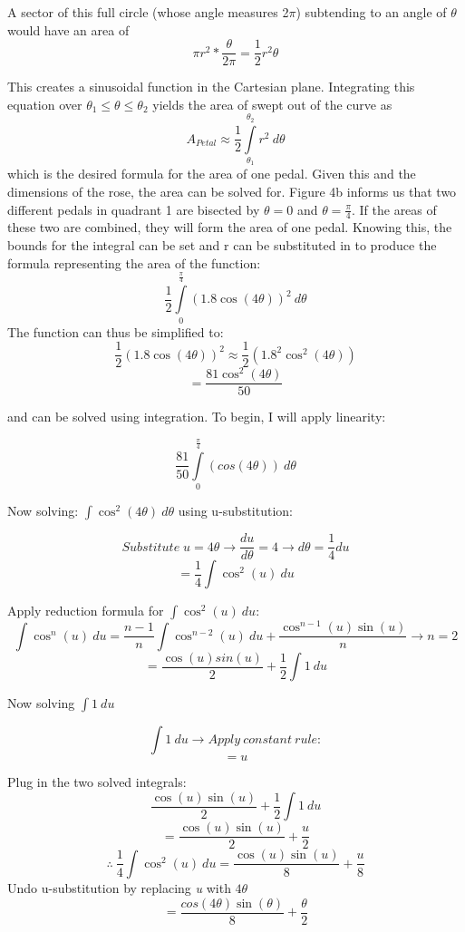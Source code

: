 \documentclass[11pt]{article}
\begin{document}
A sector of this full circle (whose angle measures 2$\pi$) subtending to an angle of $\theta$ would have an area of \\[-2ex]
\[\pi r^2 * \frac{\theta}{2\pi} = \frac{1}{2}r^2\theta\]

This creates a sinusoidal function in the Cartesian plane. Integrating this equation over $\theta_1 \leq \theta \leq \theta_2$ yields the area of swept out of the curve as
\[A_{Petal} \approx \frac{1}{2}\int\limits_{\theta_1}^{\theta_2} r^2 \ d\theta \]
which is the desired formula for the area of one pedal. Given this and the dimensions of the rose, the area can be solved for. Figure 4b informs us that two different pedals in quadrant 1 are bisected by $\theta=0$ and $\theta=\frac{\pi}{4}$. If the areas of these two are combined, they will form the area of one pedal. Knowing this, the bounds for the integral can be set and r can be substituted in to produce the formula representing the area of the function: \\[-2ex]
\[\frac{1}{2}\int\limits_{0}^{\frac{\pi}{4}} (1.8\cos(4\theta))^2 \ d\theta \]
The function can thus be simplified to:
\[\frac{1}{2}(1.8\cos(4\theta))^2 \approx \frac{1}{2}(1.8^2\cos^2(4\theta))\]
\[=\frac{81\cos^2(4\theta)}{50}\]


and can be solved using integration. To begin, I will apply linearity:

\[\frac{81}{50}\int\limits_{0}^{\frac{\pi}{4}} (cos(4\theta)) \ d\theta \]

Now solving: $\int \cos^2(4\theta) \ d\theta$ using u-substitution:

\[Substitute\; u=4\theta \rightarrow \frac{du}{d\theta} = 4 \rightarrow d\theta = \frac{1}{4}du\]
\[=\boxed{\frac{1}{4}\int \cos^2(u)\ du}\]

\newpage
Apply reduction formula for $\int \cos^2(u) \ du$:
\[\int \cos^n(u) \ du=\frac{n-1}{n}\int \cos^{n-2}(u) \ du + \frac{\cos^{n-1}(u)\sin(u)}{n} \rightarrow n = 2\]
\[=\frac{\cos(u)sin(u)}{2} + \frac{1}{2} \int 1 \ du\]

Now solving $\int 1 \ du$

\[\int 1 \ du \rightarrow Apply \ constant \ rule:\]
\[= \boxed{u}\]

Plug in the two solved integrals:
\[\frac{\cos(u)\sin(u)}{2} + \frac{1}{2}\int 1 \ du\]
\[= \frac{\cos(u)\sin(u)}{2} + \frac{u}{2} \]
\[\therefore \ \frac{1}{4}\int \cos^2(u)\ du = \frac{\cos(u)\sin(u)}{8} + \frac{u}{8} \]
Undo u-substitution by replacing \emph{u} with $4\theta$
\[=\frac{cos(4\theta)\sin(\theta)}{8} + \frac{\theta}{2}\]
\end{document}
